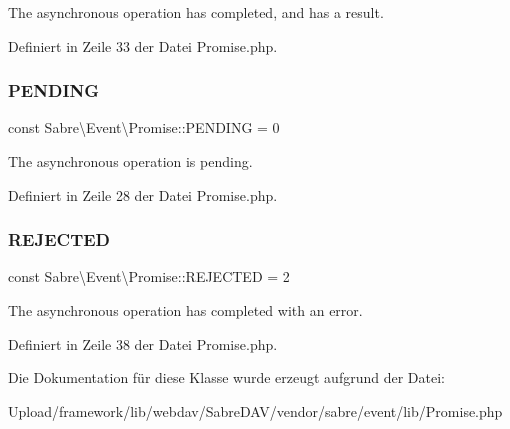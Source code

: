 The asynchronous operation has completed, and has a result. 

Definiert in Zeile 33 der Datei Promise.\+php.

\mbox{\label{class_sabre_1_1_event_1_1_promise_aa7609f4a75ccc2d8ffff06cb4bb450da}} 
\subsubsection{\texorpdfstring{P\+E\+N\+D\+I\+NG}{PENDING}}
{\footnotesize\ttfamily const Sabre\textbackslash{}\+Event\textbackslash{}\+Promise\+::\+P\+E\+N\+D\+I\+NG = 0}

The asynchronous operation is pending. 

Definiert in Zeile 28 der Datei Promise.\+php.

\mbox{\label{class_sabre_1_1_event_1_1_promise_abdcac79da741ea6b4ac3d5c605e58b99}} 
\subsubsection{\texorpdfstring{R\+E\+J\+E\+C\+T\+ED}{REJECTED}}
{\footnotesize\ttfamily const Sabre\textbackslash{}\+Event\textbackslash{}\+Promise\+::\+R\+E\+J\+E\+C\+T\+ED = 2}

The asynchronous operation has completed with an error. 

Definiert in Zeile 38 der Datei Promise.\+php.



Die Dokumentation für diese Klasse wurde erzeugt aufgrund der Datei\+:\begin{DoxyCompactItemize}
\item 
Upload/framework/lib/webdav/\+Sabre\+D\+A\+V/vendor/sabre/event/lib/Promise.\+php\end{DoxyCompactItemize}
